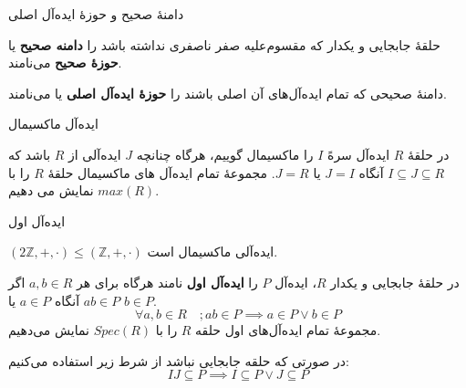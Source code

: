 \begin{frame}[t]{دامنهٔ صحیح و حوزهٔ ایده‌آل اصلی}

    \begin{definition}
        حلقهٔ جابجایی و یکدار که مقسوم‌علیه صفر ناصفری نداشته باشد را \textbf{دامنه صحیح} یا  \textbf{حوزهٔ صحیح} می‌نامند.
    \end{definition}

    \begin{definition}
        دامنهٔ صحیحی که تمام ایده‌آل‌های آن اصلی باشند را \textbf{حوزهٔ ایده‌آل اصلی} یا   می‌نامند.
    \end{definition}

    \end{frame}

\begin{frame}[t]{ایده‌آل ماکسیمال}
    \begin{definition}

        در حلقهٔ
        \(R\)
        ایده‌آل سرهً
        \(I\)
        را ماکسیمال گوییم، هرگاه چنانچه
        \(J\)
        ایده‌آلی از
        \(R\)
        باشد که
        \(I \subseteq J \subseteq R\)
        آنگاه
        \(J = I\)
        یا
        \(J = R\).
        مجموعهٔ تمام ایده‌آل های ماکسیمال حلقهٔ \(R\) را با
        \(max (R)\)
        نمایش می دهیم.


    \end{definition}


\end{frame}

\begin{frame}[t]{ایده‌آل اول}
    \setlength{\abovedisplayskip}{3pt}
    \setlength{\belowdisplayskip}{3pt}
    \begin{example}
        $(2\mathbb{Z}, +, \cdot) \leqslant (\mathbb{Z}, +, \cdot)$
        ایده‌آلی ماکسیمال است.
    \end{example}

    \begin{definition}
        در حلقهٔ جابجایی و یکدار $R$، ایده‌آل $P$ را \textbf{ایده‌آل اول} نامند هرگاه برای هر $a,b \in R$ اگر $ab \in P$ آنگاه $a \in P$ یا $b \in P$.
        \[\forall a, b \in R \quad; ab \in P \implies a \in P \lor b \in P\]
        مجموعهٔ تمام ایده‌آل‌های اول حلقه $R$ را با $Spec(R)$ نمایش می‌دهیم.

    \end{definition}


    \begin{remark}
        در صورتی که حلقه جابجایی نباشد از شرط زیر استفاده می‌کنیم:
        \[
            IJ \subseteq P \implies I \subseteq P \lor J \subseteq P
        \]
    \end{remark}
\end{frame}

